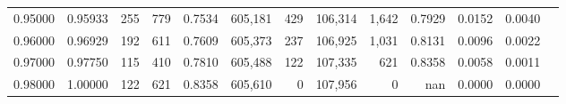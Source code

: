 \begin{tabular}{rrrrrrrrrrrrr}
0.95000 & 0.95933 &    255 &   779 &                                     0.7534 & 605,181 &     429 & 106,314 &   1,642 & 0.7929 & 0.0152 & 0.0040 \\
0.96000 & 0.96929 &    192 &   611 &                                     0.7609 & 605,373 &     237 & 106,925 &   1,031 & 0.8131 & 0.0096 & 0.0022 \\
0.97000 & 0.97750 &    115 &   410 &                                     0.7810 & 605,488 &     122 & 107,335 &     621 & 0.8358 & 0.0058 & 0.0011 \\
0.98000 & 1.00000 &    122 &   621 &                                     0.8358 & 605,610 &       0 & 107,956 &       0 &    nan & 0.0000 & 0.0000 \\
\bottomrule
\end{tabular}
